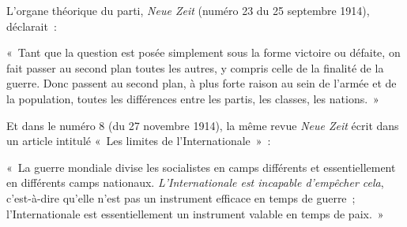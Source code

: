 \documentclass[french,twoside]{book} %
\newenvironment{quoteblock}%
  {\begin{quoting}}
  {\end{quoting}}
\newenvironment{quotebar}{%
    \def\FrameCommand{{\color{rubric!10!}\vrule width 0.5em} \hspace{0.9em}}%
    \def\OuterFrameSep{\itemsep} %
    \MakeFramed {\advance\hsize-\width \FrameRestore}
  }%
  {%
    \endMakeFramed
  }
\renewenvironment{quoteblock}%
  {%
    \savenotes
    \setstretch{0.9}
    \normalfont
    \begin{quotebar}
  }
  {%
    \end{quotebar}
    \spewnotes
  }
\begin{document}
\noindent L'organe théorique du parti, \emph{Neue Zeit} (numéro 23 du 25 septembre 1914), déclarait :\par

\begin{quoteblock}
 \noindent « Tant que la question est posée simplement sous la forme victoire ou défaite, on fait passer au second plan toutes les autres, y compris celle de la finalité de la guerre. Donc passent au second plan, à plus forte raison au sein de l’armée et de la population, toutes les différences entre les partis, les classes, les nations. »
\end{quoteblock}

\noindent Et dans le numéro 8 (du 27 novembre 1914), la même revue \emph{Neue Zeit} écrit dans un article intitulé « Les limites de l’Internationale » :\par

\begin{quoteblock}
 \noindent « La guerre mondiale divise les socialistes en camps différents et essentiellement en différents camps nationaux. \emph{L'Internationale est incapable d’empêcher cela}, c’est-à-dire qu’elle n’est  pas un instrument efficace en temps de guerre ; l’Internationale est essentiellement un instrument valable en temps de paix. »
\end{quoteblock}
\end{document}
